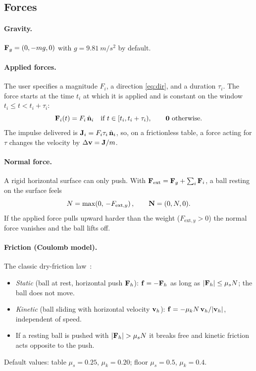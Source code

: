 \documentclass[11pt]{article}
\begin{document}
\subsection{Forces}
\paragraph{Gravity.} $\mathbf{F}_g = (0,-mg,0)$ with $g = \SI{9.81}{m/s^2}$ by default.

\paragraph{Applied forces.} The user specifies a magnitude $F_i$, a direction
\eqref{eq:dir}, and a duration $\tau_i$. The force starts at the time $t_i$ at
which it is applied and is constant on the window $t_i \le t < t_i+\tau_i$:
\begin{equation}
  \mathbf{F}_i(t) = F_i\,\hat{\mathbf{n}}_i \quad\text{if } t\in[t_i, t_i+\tau_i),\qquad \mathbf{0}\text{ otherwise.}
\end{equation}
The impulse delivered is $\mathbf{J}_i = F_i\tau_i\,\hat{\mathbf{n}}_i$, so, on a frictionless
table, a force acting for $\tau$ changes the velocity by $\Delta\mathbf{v} = \mathbf{J}/m$.

\paragraph{Normal force.} A rigid horizontal surface can only push. With
$\mathbf{F}_\text{ext} = \mathbf{F}_g + \sum_i\mathbf{F}_i$, a ball resting on the surface feels
\begin{equation}
  N = \max\!\left(0,\, -F_{\text{ext},y}\right), \qquad \mathbf{N} = (0, N, 0).
\end{equation}
If the applied force pulls upward harder than the weight ($F_{\text{ext},y}>0$) the
normal force vanishes and the ball lifts off.

\paragraph{Friction (Coulomb model).} The classic dry-friction law~\cite{halliday2013,stewart2000}:
\begin{itemize}
  \item \emph{Static} (ball at rest, horizontal push $\mathbf{F}_h$): $\mathbf{f} = -\mathbf{F}_h$ as long as
        $|\mathbf{F}_h| \le \mu_s N$; the ball does not move.
  \item \emph{Kinetic} (ball sliding with horizontal velocity $\mathbf{v}_h$):
        $\mathbf{f} = -\mu_k N\,\mathbf{v}_h/|\mathbf{v}_h|$, independent of speed.
  \item If a resting ball is pushed with $|\mathbf{F}_h| > \mu_s N$ it breaks free and
        kinetic friction acts opposite to the push.
\end{itemize}
Default values: table $\mu_s = 0.25$, $\mu_k = 0.20$; floor $\mu_s = 0.5$, $\mu_k=0.4$.
\end{document}
